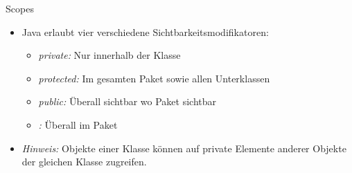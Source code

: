 \begin{frame}[c]{Scopes}
   \begin{itemize}[<+(1)->]
      \itemsep13pt
      \item Java erlaubt vier verschiedene Sichtbarkeitsmodifikatoren: \begin{itemize}
         \item \textit{private:} Nur innerhalb der Klasse
         \item \textit{protected:} Im gesamten Paket sowie allen Unterklassen
         \item \textit{public:} Überall sichtbar wo Paket sichtbar
         \item \textit{:} Überall im Paket
     \end{itemize}
     \item \textit{Hinweis:} Objekte einer Klasse können auf private Elemente anderer Objekte der gleichen Klasse zugreifen.
   \end{itemize}
\end{frame}



